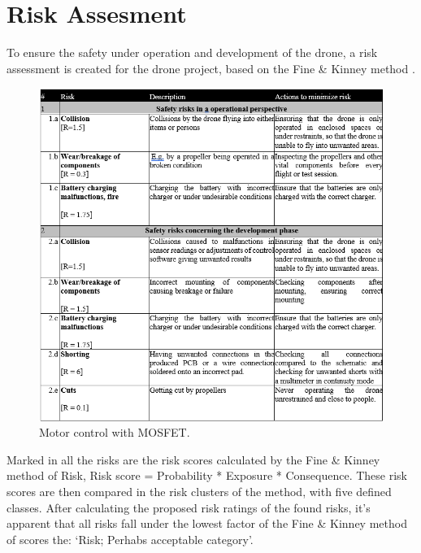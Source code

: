 \documentclass[12pt]{article}
\begin{document}
\section{Risk Assesment}

To ensure the safety under operation and development of the drone, a risk assessment is created for the drone project, based on the Fine \& Kinney method \cite{finekinney}.

\begin{figure}[H]
    \begin{center}
    \includegraphics[scale=0.7]{Risk assesment table.png}
    \end{center}
    \caption{Motor control with MOSFET.}
    \label{fig:Mosfet_Control}
\end{figure}

Marked in all the risks are the risk scores calculated by the Fine \& Kinney method of Risk, Risk score = Probability * Exposure * Consequence. These risk scores are then compared in the risk clusters of the method, with five defined classes. After calculating the proposed risk ratings of the found risks, it’s apparent that all risks fall under the lowest factor of the Fine \& Kinney method of scores the: ‘Risk; Perhabs acceptable category’. 
\end{document}

